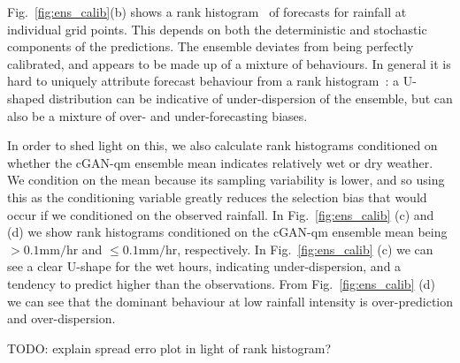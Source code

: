 \documentclass{article}
\begin{document}
Fig.~\ref{fig:ens_calib}(b) shows a rank histogram~\citep{wilks_forecast_2019} of forecasts for rainfall at individual grid points. This depends on both the deterministic and stochastic components of the predictions. The ensemble deviates from being perfectly calibrated, and appears to be made up of a mixture of behaviours. In general it is hard to uniquely attribute forecast behaviour from a rank histogram~\citep{hamill_interpretation_2001}: a U-shaped distribution can be indicative of under-dispersion of the ensemble, but can also be a mixture of over- and under-forecasting biases. 

In order to shed light on this, we also calculate rank histograms conditioned on whether the cGAN-qm ensemble mean indicates relatively wet or dry weather. We condition on the mean because its sampling variability is lower, and so using this as the conditioning variable greatly reduces the selection bias that would occur if we conditioned on the observed rainfall. In Fig.~\ref{fig:ens_calib} (c) and (d) we show rank histograms conditioned on the cGAN-qm ensemble mean being $>0.1\text{mm/hr}$ and $\leq 0.1\text{mm/hr}$, respectively. In Fig.~\ref{fig:ens_calib} (c) we can see a clear U-shape for the wet hours, indicating under-dispersion, and a tendency to predict higher than the observations. From Fig.~\ref{fig:ens_calib} (d) we can see that the dominant behaviour at low rainfall intensity is over-prediction and over-dispersion. 

TODO: explain spread erro plot in light of rank histogram?



\end{document}

